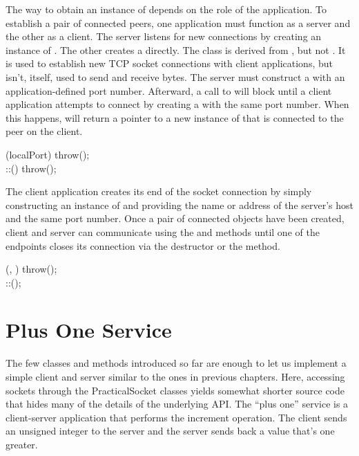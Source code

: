 The way to obtain an instance of  depends on the role
of the application.  To establish a pair of connected 
peers, one application must function as a server and the other as a
client.  The server listens for new connections by creating an
instance of .  The other creates a
 directly.  The  class is
derived from , but not .  It is
used to establish new TCP socket connections with client applications,
but isn't, itself, used to send and receive bytes.  The server must
construct a  with an application-defined port
number.  Afterward, a call to  will block until a
client application attempts to connect by creating a 
with the same port number.  When this happens, 
will return a pointer to a new instance of  that is
connected to the  peer on the client.

\begin{inlinefcn}
(localPort) 
      throw();\\
::() 
throw();
\end{inlinefcn}

The client application creates its end of the socket connection by
simply constructing an instance of  and providing the
name or address of the server's host and the same port number.  Once a
pair of connected  objects have been created, client
and server can communicate using the  and
 methods until one of the endpoints closes its
connection via the destructor or the  method.

\begin{inlinefcn}
(,
 )
throw();\\
 ::();
\end{inlinefcn}

\section{Plus One Service}

The few classes and methods introduced so far are enough to let us
implement a simple client and server similar to the ones in previous
chapters.  Here, accessing sockets through the PracticalSocket
classes yields somewhat shorter source code that hides many of the
details of the underlying API.  The ``plus one'' service is a
client-server application that performs the increment operation.  The client
sends an unsigned integer to the server and the server sends back a
value that's one greater.

